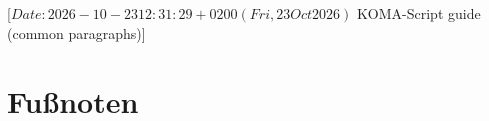 %
%
%
%
%
%
%

%
                 [$Date: 2026-10-23 12:31:29 +0200 (Fri, 23 Oct 2026) $
                  KOMA-Script guide (common paragraphs)]

\section{Fußnoten}
%
\BeginIndexGroup
{}%

